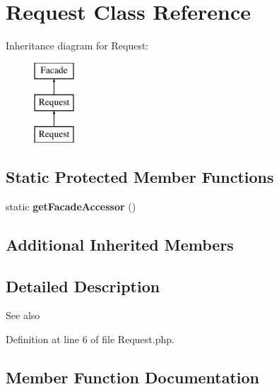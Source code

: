 \section{Request Class Reference}
\label{class_illuminate_1_1_support_1_1_facades_1_1_request}
Inheritance diagram for Request\+:\begin{figure}[H]
\begin{center}
\leavevmode
\includegraphics[height=3.000000cm]{class_illuminate_1_1_support_1_1_facades_1_1_request}
\end{center}
\end{figure}
\subsection*{Static Protected Member Functions}
\begin{DoxyCompactItemize}
\item 
static {\bf get\+Facade\+Accessor} ()
\end{DoxyCompactItemize}
\subsection*{Additional Inherited Members}


\subsection{Detailed Description}
\begin{DoxySeeAlso}{See also}

\end{DoxySeeAlso}


Definition at line 6 of file Request.\+php.



\subsection{Member Function Documentation}
